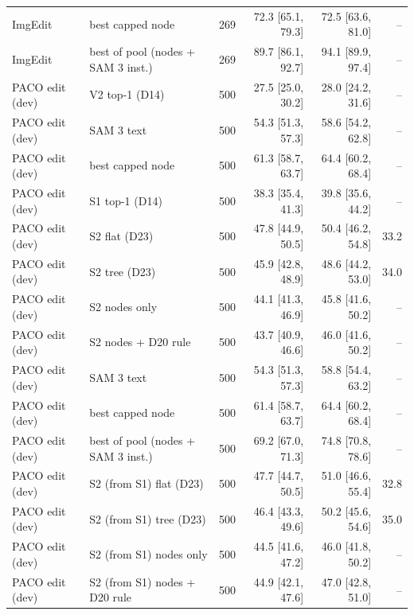 \begin{tabular}{llrrrr}
ImgEdit & best capped node & 269 & 72.3 \scriptsize{[65.1, 79.3]} & 72.5 \scriptsize{[63.6, 81.0]} & -- \\
ImgEdit & best of pool (nodes + SAM 3 inst.) & 269 & 89.7 \scriptsize{[86.1, 92.7]} & 94.1 \scriptsize{[89.9, 97.4]} & -- \\
\midrule
PACO edit (dev) & V2 top-1 (D14) & 500 & 27.5 \scriptsize{[25.0, 30.2]} & 28.0 \scriptsize{[24.2, 31.6]} & -- \\
PACO edit (dev) & SAM 3 text & 500 & 54.3 \scriptsize{[51.3, 57.3]} & 58.6 \scriptsize{[54.2, 62.8]} & -- \\
PACO edit (dev) & best capped node & 500 & 61.3 \scriptsize{[58.7, 63.7]} & 64.4 \scriptsize{[60.2, 68.4]} & -- \\
PACO edit (dev) & S1 top-1 (D14) & 500 & 38.3 \scriptsize{[35.4, 41.3]} & 39.8 \scriptsize{[35.6, 44.2]} & -- \\
\midrule
PACO edit (dev) & S2 flat (D23) & 500 & 47.8 \scriptsize{[44.9, 50.5]} & 50.4 \scriptsize{[46.2, 54.8]} & 33.2 \\
PACO edit (dev) & S2 tree (D23) & 500 & 45.9 \scriptsize{[42.8, 48.9]} & 48.6 \scriptsize{[44.2, 53.0]} & 34.0 \\
PACO edit (dev) & S2 nodes only & 500 & 44.1 \scriptsize{[41.3, 46.9]} & 45.8 \scriptsize{[41.6, 50.2]} & -- \\
PACO edit (dev) & S2 nodes + D20 rule & 500 & 43.7 \scriptsize{[40.9, 46.6]} & 46.0 \scriptsize{[41.6, 50.2]} & -- \\
PACO edit (dev) & SAM 3 text & 500 & 54.3 \scriptsize{[51.3, 57.3]} & 58.8 \scriptsize{[54.4, 63.2]} & -- \\
PACO edit (dev) & best capped node & 500 & 61.4 \scriptsize{[58.7, 63.7]} & 64.4 \scriptsize{[60.2, 68.4]} & -- \\
PACO edit (dev) & best of pool (nodes + SAM 3 inst.) & 500 & 69.2 \scriptsize{[67.0, 71.3]} & 74.8 \scriptsize{[70.8, 78.6]} & -- \\
\midrule
PACO edit (dev) & S2 (from S1) flat (D23) & 500 & 47.7 \scriptsize{[44.7, 50.5]} & 51.0 \scriptsize{[46.6, 55.4]} & 32.8 \\
PACO edit (dev) & S2 (from S1) tree (D23) & 500 & 46.4 \scriptsize{[43.3, 49.6]} & 50.2 \scriptsize{[45.6, 54.6]} & 35.0 \\
PACO edit (dev) & S2 (from S1) nodes only & 500 & 44.5 \scriptsize{[41.6, 47.2]} & 46.0 \scriptsize{[41.8, 50.2]} & -- \\
PACO edit (dev) & S2 (from S1) nodes + D20 rule & 500 & 44.9 \scriptsize{[42.1, 47.6]} & 47.0 \scriptsize{[42.8, 51.0]} & -- \\

\end{tabular}
